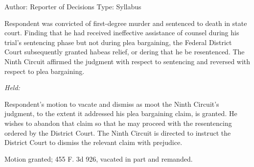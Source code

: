 Author: Reporter of Decisions
\setcounter{page}{117}
Type: Syllabus

  Respondent was convicted of first-degree murder and sentenced to death in state court. Finding that he had received ineffective assistance of counsel during his trial's sentencing phase but not during plea bargaining, the Federal District Court subsequently granted habeas relief, or dering that he be resentenced. The Ninth Circuit affirmed the judgment with respect to sentencing and reversed with respect to plea bargaining.

\emph{Held:}

  Respondent's motion to vacate and dismiss as moot the Ninth Circuit's judgment, to the extent it addressed his plea bargaining claim, is granted. He wishes to abandon that claim so that he may proceed with the resentencing ordered by the District Court. The Ninth Circuit is directed to instruct the District Court to dismiss the relevant claim with prejudice.

\noindent Motion granted; 455 F. 3d 926, vacated in part and remanded.
